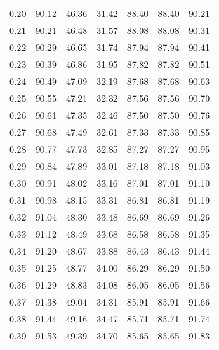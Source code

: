 \begin{tabular}{|c|c|c|c|c|c|c|}
      0.20 &     90.12 &     46.36 &      31.42 &   88.40 &      88.40 &         90.21 \\
      0.21 &     90.21 &     46.48 &      31.57 &   88.08 &      88.08 &         90.31 \\
      0.22 &     90.29 &     46.65 &      31.74 &   87.94 &      87.94 &         90.41 \\
      0.23 &     90.39 &     46.86 &      31.95 &   87.82 &      87.82 &         90.51 \\
      0.24 &     90.49 &     47.09 &      32.19 &   87.68 &      87.68 &         90.63 \\
      0.25 &     90.55 &     47.21 &      32.32 &   87.56 &      87.56 &         90.70 \\
      0.26 &     90.61 &     47.35 &      32.46 &   87.50 &      87.50 &         90.76 \\
      0.27 &     90.68 &     47.49 &      32.61 &   87.33 &      87.33 &         90.85 \\
      0.28 &     90.77 &     47.73 &      32.85 &   87.27 &      87.27 &         90.95 \\
      0.29 &     90.84 &     47.89 &      33.01 &   87.18 &      87.18 &         91.03 \\
      0.30 &     90.91 &     48.02 &      33.16 &   87.01 &      87.01 &         91.10 \\
      0.31 &     90.98 &     48.15 &      33.31 &   86.81 &      86.81 &         91.19 \\
      0.32 &     91.04 &     48.30 &      33.48 &   86.69 &      86.69 &         91.26 \\
      0.33 &     91.12 &     48.49 &      33.68 &   86.58 &      86.58 &         91.35 \\
      0.34 &     91.20 &     48.67 &      33.88 &   86.43 &      86.43 &         91.44 \\
      0.35 &     91.25 &     48.77 &      34.00 &   86.29 &      86.29 &         91.50 \\
      0.36 &     91.29 &     48.83 &      34.08 &   86.05 &      86.05 &         91.56 \\
      0.37 &     91.38 &     49.04 &      34.31 &   85.91 &      85.91 &         91.66 \\
      0.38 &     91.44 &     49.16 &      34.47 &   85.71 &      85.71 &         91.74 \\
      0.39 &     91.53 &     49.39 &      34.70 &   85.65 &      85.65 &         91.83 \\

\end{tabular}
